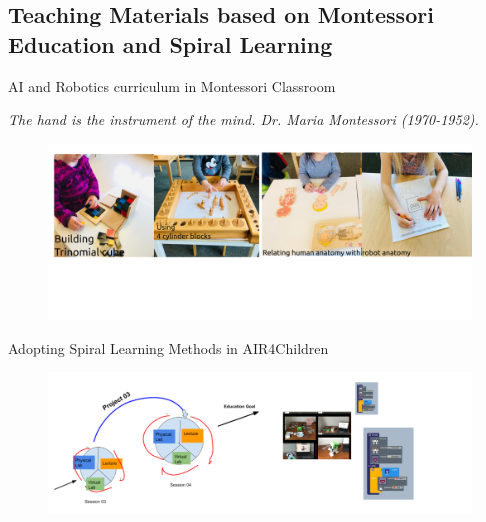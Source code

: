 \subsection{Teaching Materials based on Montessori Education and Spiral Learning}

{
\begin{frame}{AI and Robotics curriculum in Montessori Classroom} 

  \it{The hand is the instrument of the mind.} Dr. Maria Montessori (1970-1952).
    \begin{figure}
        \centering
        \includegraphics[width=1.0\textwidth]{./figures/montessori/versions/drawing-v00.png}
      \end{figure}
\end{frame}
}

{
\begin{frame}{Adopting Spiral Learning Methods in AIR4Children}

  \begin{figure}
        \centering
        \includegraphics[width=1.0\textwidth]{./figures/teaching-materials/versions/drawing-v02.png}
      \end{figure}
\end{frame}
}
